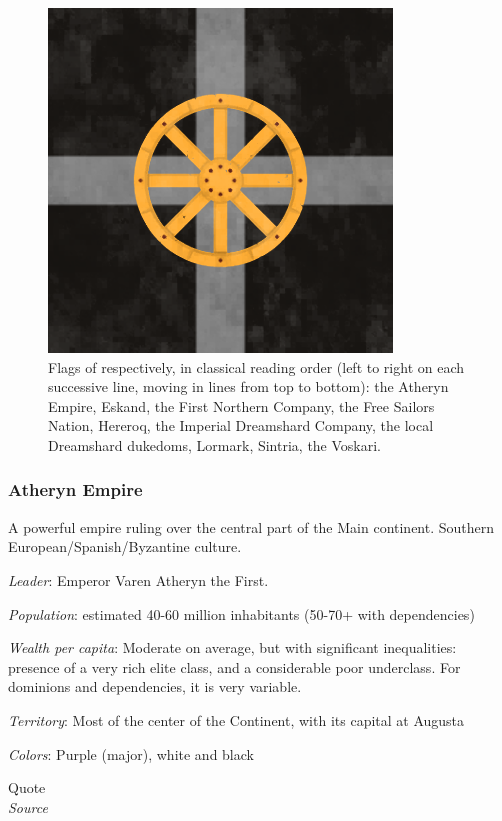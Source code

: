 \begin{figure}[!ht]
        \includegraphics[scale=0.25]{img/flag/voskari.png}

    \caption{Flags of respectively, in classical reading order (left to right on each successive line, moving in lines from top to bottom): the Atheryn Empire, Eskand, the First Northern Company, the Free Sailors Nation, Hereroq, the Imperial Dreamshard Company, the local Dreamshard dukedoms, Lormark, Sintria, the Voskari.}
    \label{flags}
\end{figure}



\subsubsection{Atheryn Empire}


A powerful empire ruling over the central part of the Main continent. Southern European/Spanish/Byzantine culture. 


\textit{Leader}: Emperor Varen Atheryn the First.

\textit{Population}: estimated 40-60 million inhabitants (50-70+ with dependencies)

\textit{Wealth per capita}: Moderate on average, but with significant inequalities: presence of a very rich elite class, and a considerable poor underclass. For dominions and dependencies, it is very variable.

\textit{Territory}: Most of the center of the Continent, with its capital at Augusta
    
\textit{Colors}: Purple (major), white and black


\begin{rpg-quotebox}
Quote \\ \textendash \textit{Source}
\end{rpg-quotebox}


